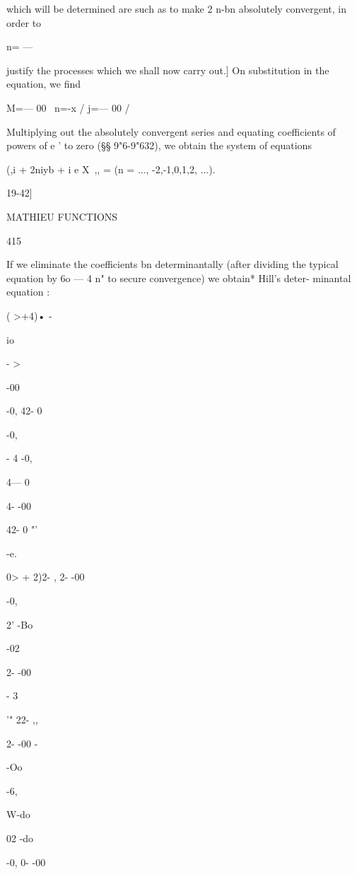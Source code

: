 which will be determined are such as to make 2 n-bn absolutely convergent, in order to 

n= —   

justify the processes which we shall now carry out.] 
On substitution in the equation, we find 

M=— 00 \ n=-x /  j=— 00 / 

Multiplying out the absolutely convergent series and equating coefficients 
of powers of e ' to zero (§§ 9"6-9"632), we obtain the system of equations 

(,i + 2niyb + i e X\ ,, = (n = ..., -2,-1,0,1,2, ...). 



19-42] 



MATHIEU FUNCTIONS 



415 



If we eliminate the coefficients bn determinantally (after dividing the 
typical equation by 6o — 4 n" to secure convergence) we obtain* Hill's deter- 
minantal equation : 



( >+4)• - 


io 


- > 


-00 


-0, 
42- 0 




-0, 


- 4 -0, 


4— 0 


4- -00 


42- 0  "' 


-e. 




0> + 2)2- , 
2- -00 


-0, 

 2' -Bo 


-02 

2- -00 




- 3 


'" 22- ,, 


2- -00 - 


-Oo 




-6, 


W-do 

02 -do 


-0, 
0- -00 





